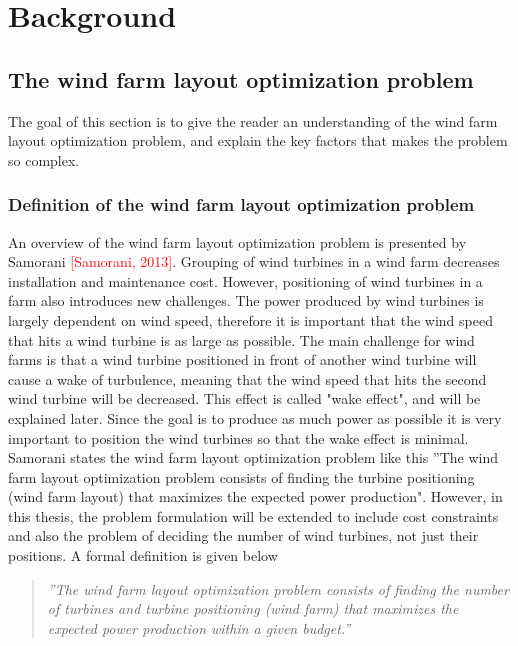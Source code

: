 \chapter{Background}


\section{The wind farm layout optimization problem}
The goal of this section is to give the reader an understanding of the wind farm layout optimization problem, and explain the key factors that makes the problem so complex.


\subsection{Definition of the wind farm layout optimization problem}
An overview of the wind farm layout optimization problem is presented by Samorani \textcolor{red}{[Samorani, 2013]}. Grouping of wind turbines in a wind farm decreases installation and maintenance cost. However, positioning of wind turbines in a farm also introduces new challenges. The power produced by wind turbines is largely dependent on wind speed, therefore it is important that the wind speed that hits a wind turbine is as large as possible. The main challenge for wind farms is that a wind turbine positioned in front of another wind turbine will cause a wake of turbulence, meaning that the wind speed that hits the second wind turbine will be decreased. This effect is called "wake effect", and will be explained later. Since the goal is to produce as much power as possible it is very important to position the wind turbines so that the wake effect is minimal. Samorani states the wind farm layout optimization problem like this ''The wind farm layout optimization problem consists of finding the turbine positioning (wind farm layout) that maximizes the expected power production". However, in this thesis, the problem formulation will be extended to include cost constraints and also the problem of deciding the number of wind turbines, not just their positions. A formal definition is given below


\begin{quote}
\textit{''The wind farm layout optimization problem consists of finding the number of turbines and turbine positioning (wind farm) that maximizes the expected power production within a given budget.''}
\end{quote}


